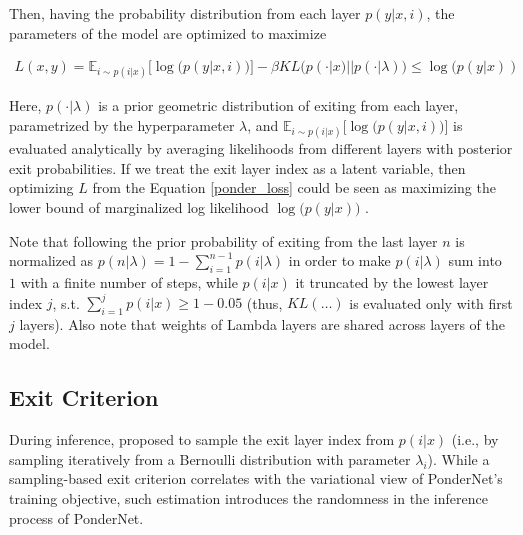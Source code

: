 \documentclass{article}
\begin{document}

Then, having the probability distribution from each layer $p(y|x, i)$, the parameters of the model are optimized to maximize

\begin{equation}
\label{ponder_loss}
\begin{split}
L(x, y) = \mathbb{E}_{i \sim p(i|x)}\Big[\log \big(p(y|x, i)\big)\Big] - \beta KL\Big(p(\cdot|x) || p(\cdot|\lambda)\Big) \leq \log \big(p(y|x))
\end{split}
\end{equation}

Here, $p(\cdot|\lambda)$ is a prior geometric distribution of exiting from each layer, parametrized by the hyperparameter $\lambda$, and $\mathbb{E}_{i \sim p(i|x)}\Big[\log \big(p(y|x, i)\big)\Big]$ is evaluated analytically by averaging likelihoods from different layers with posterior exit probabilities. If we treat the exit layer index as a latent variable, then optimizing $L$ from the Equation \ref{ponder_loss} could be seen as maximizing the lower bound of marginalized log likelihood $\log \big(p(y|x)\big)$ \citep{vae}.

Note that following \citet{pondernet} the prior probability of exiting from the last layer $n$ is normalized as $p(n|\lambda) = 1 - \sum_{i = 1}^{n - 1}p(i|\lambda)$ in order to make $p(i|\lambda)$ sum into $1$ with a finite number of steps, while $p(i|x)$ it truncated by the lowest layer index $j$, s.t. $\sum_{i=1}^j p(i|x) \geq 1 - 0.05$ (thus, $KL(\dots)$ is evaluated only with first $j$ layers). Also note that weights of Lambda layers are shared across layers of the model.


\subsection{Exit Criterion}


\label{q-exit}
During inference, \citet{pondernet} proposed to sample the exit layer index from $p(i|x)$ (i.e., by sampling iteratively from a Bernoulli distribution with parameter $\lambda_i$). While a sampling-based exit criterion correlates with the variational view of PonderNet's training objective, such estimation introduces the randomness in the inference process of PonderNet. 
\end{document}
